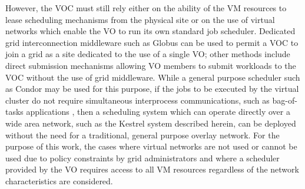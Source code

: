 However, the VOC must still rely either on the ability of the VM resources to
lease scheduling mechanisms from the physical site or on the use of virtual
networks which enable the VO to run its own standard job scheduler. Dedicated
grid interconnection middleware such as Globus \cite{Foster1997} can be used
to permit a VOC to join a grid as a site dedicated to the use of a single
VO; other methods include direct submission mechanisms allowing VO members
to submit workloads to the VOC without the use of grid middleware. While a 
general purpose scheduler such as Condor \cite{Tannenbaum2001} may be used for
this purpose, if the jobs to be executed by the virtual cluster do not require
simultaneous interprocess communications, such as bag-of-tasks applications
\cite{Beaumont2008}, then a scheduling system which can operate directly over
a wide area network, such as the Kestrel system described herein, can be deployed
without the need for a traditional, general purpose overlay network. For the
purpose of this work, the cases where virtual networks are not used or cannot
be used due to policy constraints by grid administrators and where a scheduler
provided by the VO requires access to all VM resources regardless of the network
characteristics are considered. 

